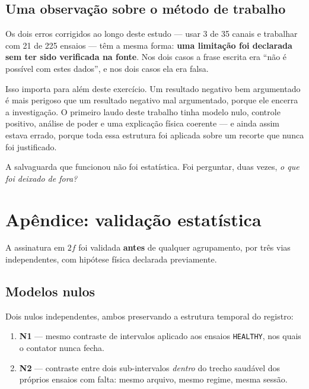 \documentclass[12pt,a4paper]{article}
\begin{document}
\subsection*{Uma observação sobre o método de trabalho}

Os dois erros corrigidos ao longo deste estudo --- usar 3 de 35 canais e trabalhar com 21 de 225 ensaios --- têm a mesma forma: \textbf{uma limitação foi declarada sem ter sido verificada na fonte}. Nos dois casos a frase escrita era ``não é possível com estes dados'', e nos dois casos ela era falsa.

Isso importa para além deste exercício. Um resultado negativo bem argumentado é mais perigoso que um resultado negativo mal argumentado, porque ele encerra a investigação. O primeiro laudo deste trabalho tinha modelo nulo, controle positivo, análise de poder e uma explicação física coerente --- e ainda assim estava errado, porque toda essa estrutura foi aplicada sobre um recorte que nunca foi justificado.

A salvaguarda que funcionou não foi estatística. Foi perguntar, duas vezes, \emph{o que foi deixado de fora?}

\section*{Apêndice: validação estatística}

A assinatura em $2f$ foi validada \textbf{antes} de qualquer agrupamento, por três vias independentes, com hipótese física declarada previamente.

\subsection*{Modelos nulos}

Dois nulos independentes, ambos preservando a estrutura temporal do registro:
\begin{enumerate}[nosep]
    \item \textbf{N1} --- mesmo contraste de intervalos aplicado aos ensaios \texttt{HEALTHY}, nos quais o contator nunca fecha.
    \item \textbf{N2} --- contraste entre dois sub-intervalos \emph{dentro} do trecho saudável dos próprios ensaios com falta: mesmo arquivo, mesmo regime, mesma sessão.
\end{enumerate}
\end{document}
